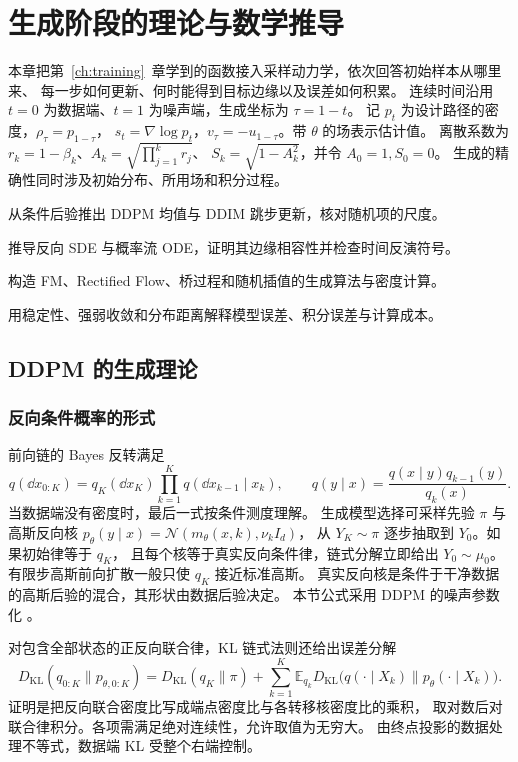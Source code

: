 \chapter{生成阶段的理论与数学推导}
\label{ch:generation}

本章把第~\ref{ch:training}~章学到的函数接入采样动力学，依次回答初始样本从哪里来、
每一步如何更新、何时能得到目标边缘以及误差如何积累。
连续时间沿用 \(t=0\) 为数据端、\(t=1\) 为噪声端，生成坐标为 \(\tau=1-t\)。
记 \(p_t\) 为设计路径的密度，\(\rho_\tau=p_{1-\tau}\)，
\(s_t=\nabla\log p_t\)，\(v_\tau=-u_{1-\tau}\)。带 \(\theta\) 的场表示估计值。
离散系数为 \(r_k=1-\beta_k\)、\(A_k=\sqrt{\prod_{j=1}^k r_j}\)、
\(S_k=\sqrt{1-A_k^2}\)，并令 \(A_0=1,S_0=0\)。
生成的精确性同时涉及初始分布、所用场和积分过程。

\begin{learningobjectives}
  \item 从条件后验推出 DDPM 均值与 DDIM 跳步更新，核对随机项的尺度。
  \item 推导反向 SDE 与概率流 ODE，证明其边缘相容性并检查时间反演符号。
  \item 构造 FM、Rectified Flow、桥过程和随机插值的生成算法与密度计算。
  \item 用稳定性、强弱收敛和分布距离解释模型误差、积分误差与计算成本。
\end{learningobjectives}

\section{DDPM 的生成理论}
\label{sec:generation-ddpm}

\subsection{反向条件概率的形式}

前向链的 Bayes 反转满足
\[
 q(\dd x_{0:K})=q_K(\dd x_K)\prod_{k=1}^Kq(\dd x_{k-1}\mid x_k),
 \qquad q(y\mid x)=\frac{q(x\mid y)q_{k-1}(y)}{q_k(x)}.
\]
当数据端没有密度时，最后一式按条件测度理解。
生成模型选择可采样先验 \(\pi\) 与高斯反向核
\(p_\theta(y\mid x)=\mathcal N(m_\theta(x,k),\nu_k I_d)\)，
从 \(Y_K\sim\pi\) 逐步抽取到 \(Y_0\)。如果初始律等于 \(q_K\)，
且每个核等于真实反向条件律，链式分解立即给出 \(Y_0\sim\mu_0\)。
有限步高斯前向扩散一般只使 \(q_K\) 接近标准高斯。
真实反向核是条件于干净数据的高斯后验的混合，其形状由数据后验决定。
本节公式采用 DDPM 的噪声参数化 \cite{ho2020ddpm}。

对包含全部状态的正反向联合律，KL 链式法则还给出误差分解
\[
 D_{\mathrm{KL}}(q_{0:K}\|p_{\theta,0:K})
 =D_{\mathrm{KL}}(q_K\|\pi)+\sum_{k=1}^K
 \mathbb E_{q_k}D_{\mathrm{KL}}\bigl(q(\cdot\mid X_k)\|
                                      p_\theta(\cdot\mid X_k)\bigr).
\]
证明是把反向联合密度比写成端点密度比与各转移核密度比的乘积，
取对数后对联合律积分。各项需满足绝对连续性，允许取值为无穷大。
由终点投影的数据处理不等式，数据端 KL 受整个右端控制。

